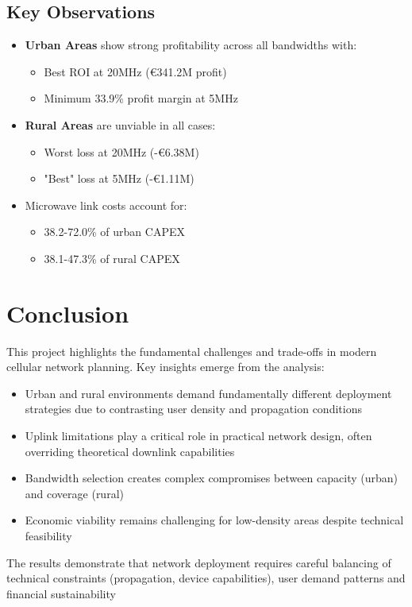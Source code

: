 \documentclass[a4paper,12pt]{article}
\begin{document}
\subsection*{Key Observations}
\begin{itemize}
\item \textbf{Urban Areas} show strong profitability across all bandwidths with:
\begin{itemize}
\item Best ROI at 20MHz (€341.2M profit)
\item Minimum 33.9\% profit margin at 5MHz
\end{itemize}

\item \textbf{Rural Areas} are unviable in all cases:
\begin{itemize}
\item Worst loss at 20MHz (-€6.38M)
\item "Best" loss at 5MHz (-€1.11M)
\end{itemize}

\item Microwave link costs account for:
\begin{itemize}
\item 38.2-72.0\% of urban CAPEX
\item 38.1-47.3\% of rural CAPEX
\end{itemize}
\end{itemize}



\section{Conclusion}

This project highlights the fundamental challenges and trade-offs in modern cellular network planning. Key insights emerge from the analysis:

\begin{itemize}
\item Urban and rural environments demand fundamentally different deployment strategies due to contrasting user density and propagation conditions
\item Uplink limitations play a critical role in practical network design, often overriding theoretical downlink capabilities
\item Bandwidth selection creates complex compromises between capacity (urban) and coverage (rural)
\item Economic viability remains challenging for low-density areas despite technical feasibility
\end{itemize}

\bigskip
The results demonstrate that network deployment requires careful balancing of technical constraints (propagation, device capabilities), user demand patterns and financial sustainability
\end{document}
